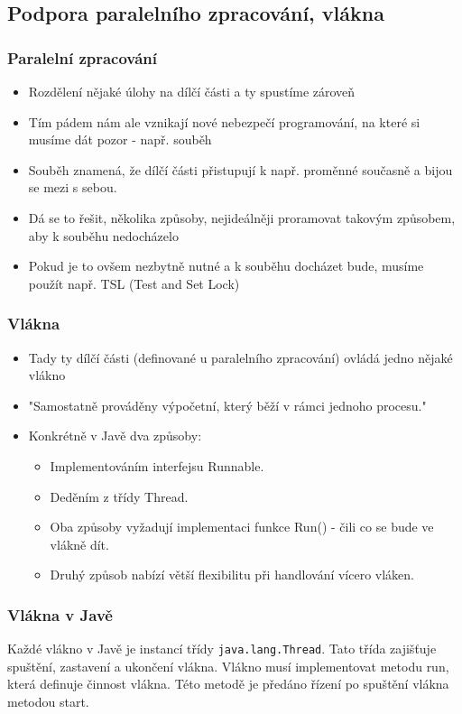 \documentclass[10pt,a4paper]{article}
\begin{document}
\subsection{Podpora paralelního zpracování, vlákna}
\subsubsection{Paralelní zpracování}
\begin{itemize}
\item Rozdělení nějaké úlohy na dílčí části a ty spustíme zároveň
\item Tím pádem nám ale vznikají nové nebezpečí programování, na které si musíme dát pozor - např. souběh
\item Souběh znamená, že dílčí části přistupují k např. proměnné současně a bijou se mezi s sebou.
\item Dá se to řešit, několika způsoby, nejideálněji proramovat takovým způsobem, aby k souběhu nedocházelo
\item Pokud je to ovšem nezbytně nutné a k souběhu docházet bude, musíme použít např. TSL (Test and Set Lock)
\end{itemize}

\subsubsection{Vlákna}
\begin{itemize}
\item Tady ty dílčí části (definované u paralelního zpracování) ovládá jedno nějaké vlákno
\item "Samostatně prováděny výpočetní, který běží v rámci jednoho procesu."
\item Konkrétně v Javě dva způsoby:
\begin{itemize}
\item Implementováním interfejsu Runnable.
\item Deděním z třídy Thread.
\item Oba způsoby vyžadují implementaci funkce Run() - čili co se bude ve vlákně dít.
\item Druhý způsob nabízí větší flexibilitu při handlování vícero vláken.
\end{itemize}
\end{itemize}
\subsubsection{Vlákna v Javě}
Každé vlákno v Javě je instancí třídy \texttt{java.lang.Thread}. Tato třída zajišťuje spuštění, zastavení a ukončení vlákna. Vlákno musí implementovat metodu run, která definuje činnost vlákna. Této metodě je předáno řízení po spuštění vlákna metodou start.
\end{document}
